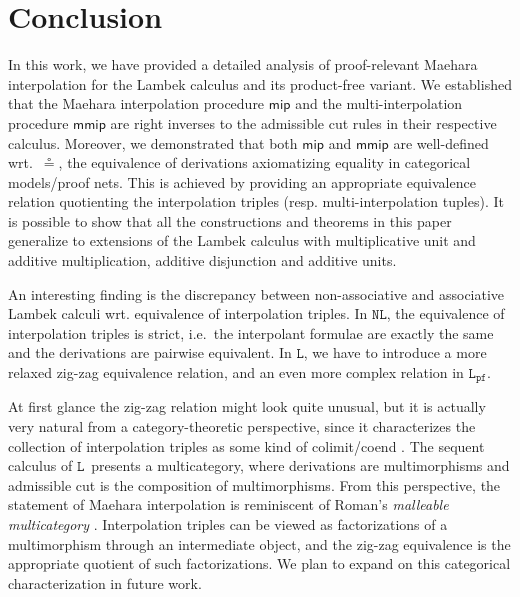 \documentclass[a4paper,UKenglish,cleveref,autoref,thm-restate, anonymous]{lipics-v2021}
\newcommand{\mf}[1]{\mathsf{#1}}
\newcommand{\MIP}{\textsf{MIP}}
\newcommand{\MmIP}{\textsf{MmIP}}
\renewcommand{\L}{$\mathtt{L}$}
\newcommand{\LPfree}{$\mathtt{L_{pf}}$}
\newcommand{\NL}{$\mathtt{NL}$}
\begin{document}
\section{Conclusion}
In this work, we have provided a detailed analysis of proof-relevant Maehara interpolation for the Lambek calculus and its product-free variant.
We established that the Maehara interpolation procedure $\mf{mip}$ and the multi-interpolation procedure $\mf{mmip}$ are right inverses to the admissible cut rules in their respective calculus.
Moreover, we demonstrated that both $\mf{mip}$ and $\mf{mmip}$ are well-defined wrt.\ $\circeq$, the equivalence of derivations axiomatizing equality in categorical models/proof nets.
This is achieved by providing an appropriate equivalence relation quotienting the interpolation triples (resp. multi-interpolation tuples). It is possible to show that all the constructions and theorems in this paper generalize to extensions of the Lambek calculus with multiplicative unit and additive multiplication, additive disjunction and additive units.

An interesting finding is the discrepancy between non-associative and associative Lambek calculi wrt. equivalence of interpolation triples.
In \NL, the equivalence of interpolation triples is strict, i.e.\ the interpolant formulae are exactly the same and the derivations are pairwise equivalent.
In \L, we have to introduce a more relaxed zig-zag equivalence relation, and an even more complex relation in \LPfree. 

At first glance the zig-zag relation might look quite unusual, but it is actually very natural from a category-theoretic perspective, since it characterizes the collection of interpolation triples as some kind of colimit/coend \cite{Loregian_2021}.
The sequent calculus of \L\ presents a multicategory, where derivations are multimorphisms and admissible cut is the composition of multimorphisms.
From this perspective, the statement of Maehara interpolation is reminiscent of Roman's \emph{malleable multicategory} \cite{Roman2023}.  Interpolation triples can be viewed as factorizations of a multimorphism through an intermediate object, and the zig-zag equivalence is the appropriate quotient of such factorizations. 
We plan to expand on this categorical characterization in future work.
\end{document}
